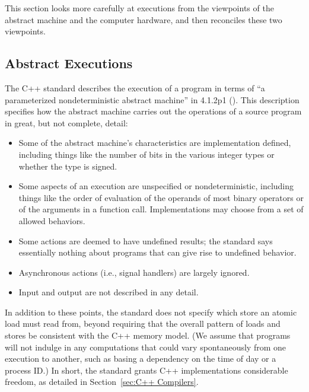 This section looks more carefully at executions from the viewpoints of
the abstract machine and the computer hardware, and then reconciles
these two viewpoints.

\subsection{Abstract Executions}
\label{sec:Abstract Executions}

The C++ standard describes the execution of a program in terms of
``a parameterized nondeterministic abstract machine'' in 4.1.2p1
().
This description specifies how the abstract machine carries out the
operations of a source program in great, but not complete, detail:
\begin{itemize}
\item	Some of the abstract machine's characteristics are
	implementation defined, including things like the number of
	bits in the various integer types
	or whether the  type is signed.
\item	Some aspects of an execution are unspecified or nondeterministic,
	including things like the order of evaluation of the operands
	of most binary operators or of the arguments in a function call.
	Implementations may choose from a set of allowed behaviors.
\item	Some actions are deemed to have undefined results; the standard
	says essentially nothing about programs that can give rise to
	undefined behavior.
\item	Asynchronous actions (i.e., signal handlers) are largely ignored.
\item	Input and output are not described in any detail.
\end{itemize}
In addition to these points, the standard does not specify which store
an atomic load must read from, beyond requiring that the overall
pattern of loads and stores be consistent with the C++ memory model.
(We assume that programs will not indulge in any computations that
could vary spontaneously from one execution to another,
such as basing a dependency on the time of day or a process ID.)
In short, the standard grants C++ implementations considerable freedom,
as detailed in
Section~\ref{sec:C++ Compilers}.

